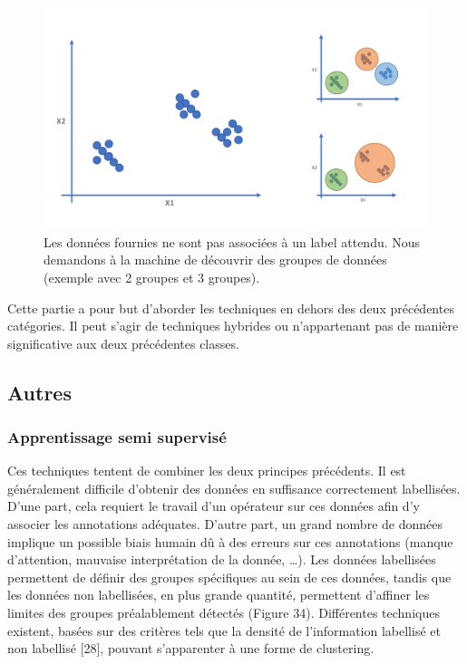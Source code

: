 \begin{figure}[H]
    \centering
    \includegraphics[width=\linewidth]{contents/chapter_3/resources/unsupervised.pdf}
    \caption{Les données fournies ne sont pas associées à un label attendu. Nous demandons à la machine de découvrir des groupes de données (exemple avec 2 groupes et 3 groupes).}
    \label{fig:unsupervised}
\end{figure}

Cette partie a pour but d’aborder les techniques en dehors des deux précédentes catégories. Il peut s’agir de techniques hybrides ou n’appartenant pas de manière significative aux deux précédentes classes. 

\subsection{Autres}
\subsubsection{Apprentissage semi supervisé}
Ces techniques tentent de combiner les deux principes précédents. Il est généralement difficile d’obtenir des données en suffisance correctement labellisées. D’une part, cela requiert le travail d’un opérateur sur ces données afin d’y associer les annotations adéquates. D’autre part, un grand nombre de données implique un possible biais humain dû à des erreurs sur ces annotations (manque d’attention, mauvaise interprétation de la donnée, …).
Les données labellisées permettent de définir des groupes spécifiques au sein de ces données, tandis que les données non labellisées, en plus grande quantité, permettent d’affiner les limites des groupes préalablement détectés (Figure 34). Différentes techniques existent, basées sur des critères tels que la densité de l’information labellisé et non labellisé [28], pouvant s’apparenter à une forme de clustering.
 
